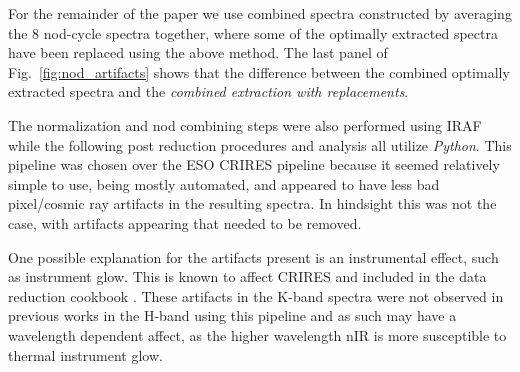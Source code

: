 For the remainder of the paper we use combined spectra constructed by averaging the 8 nod-cycle spectra together, where some of the optimally extracted spectra have been replaced using the above method. The last panel of Fig.~\ref{fig:nod_artifacts} shows that the difference between the combined optimally extracted spectra and the \emph{combined extraction with replacements}.


The normalization and nod combining steps were also performed using IRAF while the following post reduction procedures and analysis all utilize \emph{Python}. This pipeline was chosen over the ESO CRIRES pipeline because it seemed relatively simple to use, being mostly automated, and appeared to have less bad pixel/cosmic ray artifacts in the resulting spectra. In hindsight this was not the case, with artifacts appearing that needed to be removed. 

One possible explanation for the artifacts present is an instrumental effect, such as instrument glow. This is known to affect CRIRES and included in the data reduction cookbook \citep{smoker_very_2012}. These artifacts in the K-band spectra were not observed in previous works in the H-band using this pipeline and as such may have a wavelength dependent affect, as the higher wavelength nIR is more susceptible to thermal instrument glow.

